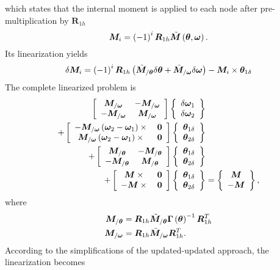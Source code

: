 \documentclass[10pt,fleqn,subeqn]{report}
\newcommand{\T}[1]{\bm{#1}}
\begin{document}
which states that the internal moment is applied to each node 
after pre-multiplication by $\T{R}_{1h}$
\begin{equation}
	\T{M}_i = \plbr{-1}^i \T{R}_{1h} \tilde{\T{M}}\plbr{\T{\theta}, \T{\omega}} .
\end{equation}
Its linearization yields
\begin{equation}
	\delta\T{M}_i = \plbr{-1}^i \T{R}_{1h} \plbr{
		\tilde{\T{M}}_{/\T{\theta}} \delta \T{\theta}
		+ \tilde{\T{M}}_{/\T{\omega}} \delta\T{\omega}
	} - \T{M}_i \times \T{\theta}_{1\delta}
\end{equation}
The complete linearized problem is
\begin{align}
	\sqbr{\matr{cc}{
		\T{M}_{/\T{\omega}} & - \T{M}_{/\T{\omega}} \\
		- \T{M}_{/\T{\omega}} & \T{M}_{/\T{\omega}}
	}}\cubr{\cvvect{
		\delta\T{\omega}_1 \\
		\delta\T{\omega}_2
	}} & \nonumber \\
	+ \sqbr{\matr{cc}{
		- \T{M}_{/\T{\omega}} \plbr{\T{\omega}_2 - \T{\omega}_1}\times{} & \T{0} \\
		\T{M}_{/\T{\omega}} \plbr{\T{\omega}_2 - \T{\omega}_1}\times{} & \T{0}
	}} \cubr{\cvvect{
		\T{\theta}_{1\delta} \\
		\T{\theta}_{2\delta}
	}} & \nonumber \\
	+ \sqbr{\matr{cc}{
		\T{M}_{/\T{\theta}} & - \T{M}_{/\T{\theta}} \\
		- \T{M}_{/\T{\theta}} & \T{M}_{/\T{\theta}}
	}} \cubr{\cvvect{
		\T{\theta}_{1\delta} \\
		\T{\theta}_{2\delta}
	}} & \nonumber \\
	+ \sqbr{\matr{cc}{
		\T{M}\times{} & \T{0} \\
		- \T{M}\times{} & \T{0}
	}} \cubr{\cvvect{
		\T{\theta}_{1\delta} \\
		\T{\theta}_{2\delta}
	}} &= \cubr{\cvvect{
		\T{M} \\
		- \T{M}
	}} ,
\end{align}
where
\begin{subequations}
\begin{align}
	\T{M}_{/\T{\theta}} &= \T{R}_{1h} \tilde{\T{M}}_{/\T{\theta}} \T{\Gamma}\plbr{\T{\theta}}^{-1} \T{R}_{1h}^T \\
	\T{M}_{/\T{\omega}} &= \T{R}_{1h} \tilde{\T{M}}_{/\T{\omega}} \T{R}_{1h}^T .
\end{align}
\end{subequations}
According to the simplifications of the updated-updated approach, the linearization becomes
\end{document}
